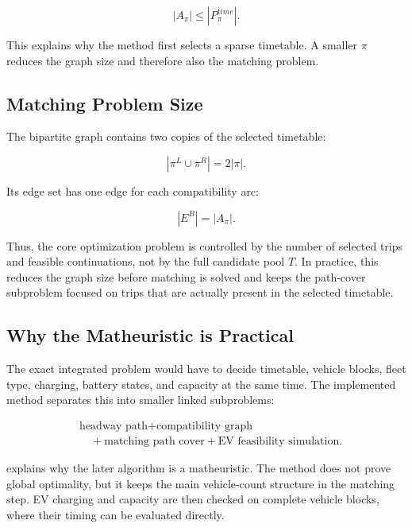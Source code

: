 \begin{equation}
|A_\pi|\le |P^{time}_\pi|.
\label{eq:arc-bound}
\end{equation}

This explains why the method first selects a sparse timetable. A smaller
\(\pi\) reduces the graph size and therefore also the matching problem.

\subsection{Matching Problem Size}

The bipartite graph contains two copies of the selected timetable:

\begin{equation}
|\pi^L\cup\pi^R|=2|\pi|.
\label{eq:bipartite-node-count}
\end{equation}

Its edge set has one edge for each compatibility arc:

\begin{equation}
|E^B|=|A_\pi|.
\label{eq:bipartite-edge-count}
\end{equation}

Thus, the core optimization problem is controlled by the number of selected
trips and feasible continuations, not by the full candidate pool \(T\). In
practice, this reduces the graph size before matching is solved and keeps the
path-cover subproblem focused on trips that are actually present in the
selected timetable.

\subsection{Why the Matheuristic is Practical}

The exact integrated problem would have to decide timetable, vehicle blocks,
fleet type, charging, battery states, and capacity at the same time. The
implemented method separates this into smaller linked subproblems:

\begin{equation}
\begin{aligned}
&\text{headway path}
+\text{compatibility graph}\\
&\quad
+\text{matching path cover}
+\text{EV feasibility simulation}.
\end{aligned}
\label{eq:method-decomposition}
\end{equation}

 explains why the later algorithm is a
matheuristic. The method does not prove global optimality, but it keeps the
main vehicle-count structure in the matching step. EV charging and capacity are
then checked on complete vehicle blocks, where their timing can be evaluated
directly.

